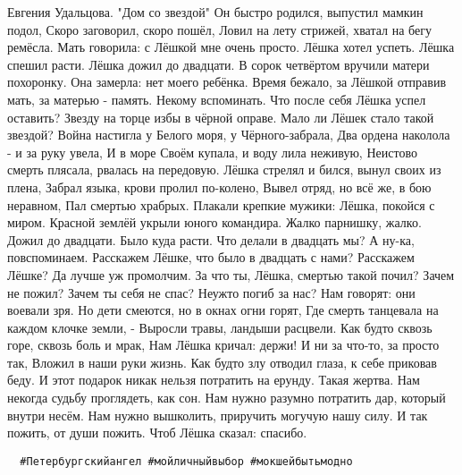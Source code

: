 Евгения Удальцова. "Дом со звездой"
Он быстро родился, выпустил мамкин подол, 
Скоро заговорил, скоро пошёл, 
Ловил на лету стрижей, хватал на бегу ремёсла. 
Мать говорила: с Лёшкой мне очень просто. 
Лёшка хотел успеть. Лёшка спешил расти. 
Лёшка дожил до двадцати. 
В сорок четвёртом вручили матери похоронку. 
Она замерла: нет моего ребёнка. 
Время бежало, за Лёшкой отправив мать, 
за матерью - память. Некому вспоминать. 
Что после себя Лёшка успел оставить? 
Звезду на торце избы в чёрной оправе. 
Мало ли Лёшек стало такой звездой? 
Война настигла у Белого моря, у Чёрного-забрала, 
Два ордена наколола - и за руку увела, 
И в море Своём купала, и воду лила неживую, 
Неистово смерть плясала, рвалась на передовую. 
Лёшка стрелял и бился, вынул своих из плена, 
Забрал языка, крови пролил по-колено, 
Вывел отряд, но всё же, в бою неравном, 
Пал смертью храбрых. 
Плакали крепкие мужики: Лёшка, покойся с миром. 
Красной землёй укрыли юного командира. 
Жалко парнишку, жалко. 
Дожил до двадцати. 
Было куда расти. 
Что делали в двадцать мы? А ну-ка, повспоминаем. 
Расскажем Лёшке, что было в двадцать с нами? 
Расскажем Лёшке? Да лучше уж промолчим. 
За что ты, Лёшка, смертью такой почил? 
Зачем не пожил? Зачем ты себя не спас? 
Неужто погиб за нас? 
Нам говорят: они воевали зря. 
Но дети смеются, но в окнах огни горят, 
Где смерть танцевала на каждом клочке земли, - 
Выросли травы, ландыши расцвели. 
Как будто сквозь горе, сквозь боль и мрак, 
Нам Лёшка кричал: держи! 
И ни за что-то, за просто так, 
Вложил в наши руки жизнь. 
Как будто злу отводил глаза, к себе приковав беду. 
И этот подарок никак нельзя потратить на ерунду. 
Такая жертва. Нам некогда судьбу проглядеть, как сон. 
Нам нужно разумно потратить дар, который внутри несём. 
Нам нужно вышколить, приручить могучую нашу силу. 
И так пожить, от души пожить. 
Чтоб Лёшка сказал: спасибо.

\begin{verbatim}
  #Петербургскийангел #мойличныйвыбор #мокшейбытьмодно
\end{verbatim}
